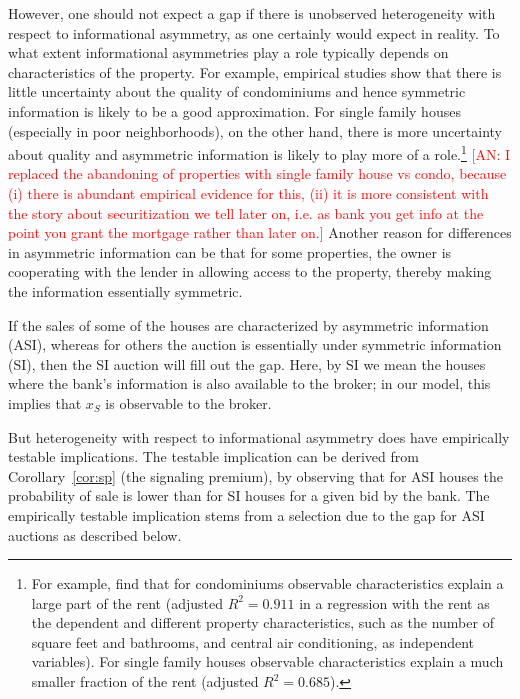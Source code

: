 \documentclass[11pt,twopage]{article}
\newcommand{\AN}[1]{\textcolor{red}{[AN: #1]}}
\begin{document}
However, one should not expect a gap if there is unobserved
heterogeneity with respect to informational asymmetry, as one certainly
would expect in reality. To what extent informational asymmetries play
a role typically depends on characteristics of the property.
For example, empirical studies show that there is little uncertainty about the quality
of condominiums and hence symmetric information is likely to be a good
approximation. For single family houses (especially in poor neighborhoods), on the other
hand, there is more uncertainty
about quality and asymmetric information is likely to play more of a 
role.\footnote{For example, \cite{allen1995implicit}
find that for condominiums observable characteristics explain a large
part of the rent (adjusted $R^2=0.911$ in a regression with the rent as the dependent
and different property characteristics, such as the number of square feet and bathrooms,
and central air conditioning, as independent variables). For single
family houses observable characteristics explain a much smaller fraction of the 
rent (adjusted $R^2=0.685$).}
\AN{I replaced the abandoning of properties with single family house vs condo, because (i)
there is abundant empirical evidence for this, (ii) it is more consistent with the
story about securitization we tell later on, i.e. as bank you get info at the point
you grant the mortgage rather than later on.}
Another reason for differences in asymmetric information can be that for some 
properties, the owner is cooperating with the lender in allowing access to the 
property, thereby making the information essentially symmetric.

If the sales of some of the houses are
characterized by asymmetric information (ASI), whereas for others the
auction is essentially under symmetric information (SI), then the SI
auction will fill out the gap. Here, by SI we mean the houses where
the bank's information is also available to the broker; in our model,
this implies that $x_S$ is observable to the broker.



But heterogeneity with respect to informational asymmetry does have
empirically testable implications.
The testable implication can be derived from Corollary~\ref{cor:sp}
(the signaling premium), by observing that for ASI houses the
probability of sale is lower than for SI houses for a given bid by the
bank. The empirically testable implication stems from a selection due
to the gap for ASI auctions as described below.
\end{document}
